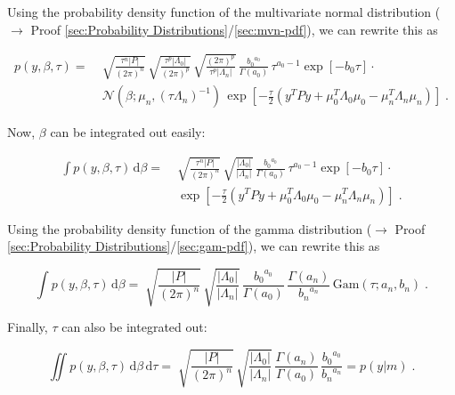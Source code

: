 \documentclass[a4paper,12pt,twoside]{book}
\begin{document}
Using the probability density function of the multivariate normal distribution ($\rightarrow$ Proof \ref{sec:Probability Distributions}/\ref{sec:mvn-pdf}), we can rewrite this as

\begin{equation} \label{eq:blr-lme-GLM-NG-LME-s2}
\begin{split}
p(y,\beta,\tau) = \; & \sqrt{\frac{\tau^n |P|}{(2 \pi)^n}} \, \sqrt{\frac{\tau^p |\Lambda_0|}{(2 \pi)^p}} \, \sqrt{\frac{(2 \pi)^p}{\tau^p |\Lambda_n|}} \, \frac{ {b_0}^{a_0}}{\Gamma(a_0)} \, \tau^{a_0-1} \exp[-b_0 \tau] \cdot \\
& \mathcal{N}(\beta; \mu_n, (\tau \Lambda_n)^{-1}) \, \exp\left[ -\frac{\tau}{2} (y^T P y + \mu_0^T \Lambda_0 \mu_0 - \mu_n^T \Lambda_n \mu_n) \right] \; .
\end{split}
\end{equation}

Now, $\beta$ can be integrated out easily:

\begin{equation} \label{eq:blr-lme-GLM-NG-LME-s3}
\begin{split}
\int p(y,\beta,\tau) \, \mathrm{d}\beta = \; & \sqrt{\frac{\tau^n |P|}{(2 \pi)^n}} \, \sqrt{\frac{|\Lambda_0|}{|\Lambda_n|}} \, \frac{ {b_0}^{a_0}}{\Gamma(a_0)} \, \tau^{a_0-1} \exp[-b_0 \tau] \cdot \\
& \exp\left[ -\frac{\tau}{2} (y^T P y + \mu_0^T \Lambda_0 \mu_0 - \mu_n^T \Lambda_n \mu_n) \right] \; .
\end{split}
\end{equation}

Using the probability density function of the gamma distribution ($\rightarrow$ Proof \ref{sec:Probability Distributions}/\ref{sec:gam-pdf}), we can rewrite this as

\begin{equation}\label{eq:blr-lme-GLM-NG-LME-s4}
\int p(y,\beta,\tau) \, \mathrm{d}\beta = \; \sqrt{\frac{|P|}{(2 \pi)^n}} \, \sqrt{\frac{|\Lambda_0|}{|\Lambda_n|}} \, \frac{ {b_0}^{a_0}}{\Gamma(a_0)} \, \frac{\Gamma(a_n)}{ {b_n}^{a_n}} \, \mathrm{Gam}(\tau; a_n, b_n) \; .
\end{equation}

Finally, $\tau$ can also be integrated out:

\begin{equation} \label{eq:blr-lme-GLM-NG-LME-s5}
\iint p(y,\beta,\tau) \, \mathrm{d}\beta \, \mathrm{d}\tau = \; \sqrt{\frac{|P|}{(2 \pi)^n}} \, \sqrt{\frac{|\Lambda_0|}{|\Lambda_n|}} \, \frac{\Gamma(a_n)}{\Gamma(a_0)} \, \frac{ {b_0}^{a_0}}{ {b_n}^{a_n}} = p(y|m) \; .
\end{equation}
\end{document}
